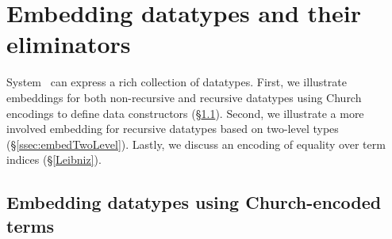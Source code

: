 \section{Embedding datatypes and their eliminators} \label{sec:data}
System \Fi\ can express a rich collection of datatypes.
First, we illustrate embeddings for both non-recursive and
recursive datatypes using Church encodings \cite{Church33} to define
data constructors (\S\ref{ssec:embedChurch}). Second, we illustrate
a more involved embedding for recursive datatypes based on two-level types
(\S\ref{ssec:embedTwoLevel}). Lastly, we discuss an encoding of equality over
term indices (\S\ref{Leibniz}).

\subsection{Embedding datatypes using Church-encoded terms}
\label{ssec:embedChurch}
